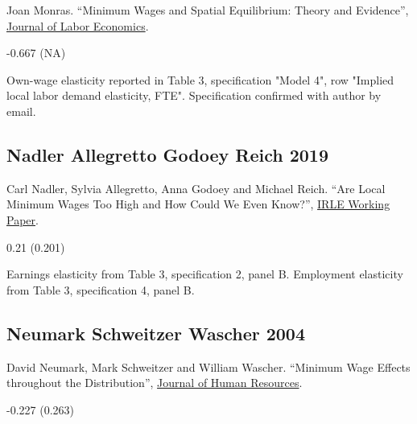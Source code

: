 \noindent Joan Monras. ``Minimum Wages and Spatial Equilibrium: Theory and Evidence'', \href{https://doi.org/10.1086/702650}{Journal of Labor Economics}.

\vspace{0.7em}

 -0.667 (NA)

\vspace{0.7em}

 Own-wage elasticity reported in Table 3, specification "Model 4", row "Implied local labor demand elasticity, FTE". Specification confirmed with author by email.

\subsection*{Nadler Allegretto Godoey Reich 2019}
\vspace{-0.7em}

\noindent Carl Nadler, Sylvia Allegretto, Anna Godoey and Michael Reich. ``Are Local Minimum Wages Too High and How Could We Even Know?'', \href{http://irle.berkeley.edu/files/2019/04/Are-Local-Minimum-Wages-Too-High.pdf}{IRLE Working Paper}.

\vspace{0.7em}

 0.21 (0.201)

\vspace{0.7em}

 Earnings elasticity from Table 3, specification 2, panel B. Employment elasticity from Table 3, specification 4, panel B.

\subsection*{Neumark Schweitzer Wascher 2004}
\vspace{-0.7em}

\noindent David Neumark, Mark Schweitzer and William Wascher. ``Minimum Wage Effects throughout the Distribution'', \href{https://doi.org/10.3368/jhr.XXXIX.2.425}{Journal of Human Resources}.

\vspace{0.7em}

 -0.227 (0.263)

\vspace{0.7em}

